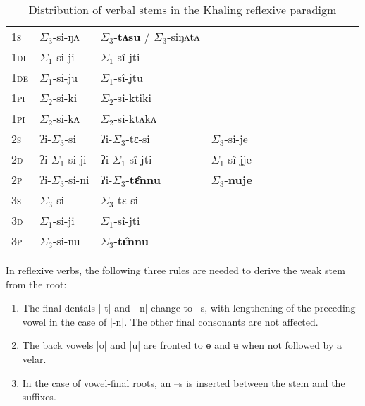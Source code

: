 \documentclass[twoside,a4paper,11pt]{article}
\newcommand{\ipa}[1]{{\phon#1}}
\newcommand{\grise}[1]{\cellcolor{lightgray}\textbf{#1}}
\newcommand{\grisf}[1]{\cellcolor{gray}\textbf{#1}}
\newcommand{\ra}{$\Sigma_1$}
\newcommand{\rbb}{$\Sigma_2$}
\newcommand{\rc}{$\Sigma_3$}
\begin{document}
\begin{table}[h]
\caption{ Distribution of verbal stems in the Khaling reflexive paradigm}
\label{tab:reflstems} \centering 
\begin{tabular}{l|l|l|l|l|l|l|l|l|l|l|l|l}  \toprule
\textsc{1s}  &  \ipa{\rc{}-si-ŋʌ}   &  \ipa{\rc{}-\textbf{tʌsu}} / \ipa{\rc{}-siŋʌtʌ}   \\ 
\textsc{1di}  &  \ipa{\ra{}-si-ji}  \grise{} &  \ipa{\ra{}-sî-jti} \grise{} \\
\textsc{1de}  &  \ipa{\ra{}-si-ju} \grise{}   &  \ipa{\ra{}-sî-jtu} \grise{} \\ 
\textsc{1pi}  &  \ipa{\rbb{}-si-ki} \grisf{}  &  \ipa{\rbb{}-si-ktiki} \grisf{}  \\ 
\textsc{1pi}  &  \ipa{\rbb{}-si-kʌ}  \grisf{}   &  \ipa{\rbb{}-si-ktʌkʌ} \grisf{} \\ 
\midrule
\textsc{2s}  &  \ipa{ʔi-\rc{}-si}   &  \ipa{ʔi-\rc{}-tɛ-si}   &  \ipa{\rc{}-si-je} \\ 
\textsc{2d}  &  \ipa{ʔi-\ra{}-si-ji}  \grise{}  &  \ipa{ʔi-\ra{}-sî-jti} \grise{}   &  \ipa{\ra{}-sî-jje} \grise{} \\
\textsc{2p}  &  \ipa{ʔi-\rc{}-si-ni}   &  \ipa{ʔi-\rc{}-\textbf{tɛ̂nnu}}   &  \ipa{\rc{}-\textbf{nuje}}  \\ 
\midrule
\textsc{3s}  &  \ipa{\rc{}-si}   &  \ipa{\rc{}-tɛ-si} \\ 
\textsc{3d}  &  \ipa{\ra{}-si-ji} \grise{}   &  \ipa{\ra{}-sî-jti}\grise{} \\ 
\textsc{3p}  &  \ipa{\rc{}-si-nu}   &  \ipa{\rc{}-\textbf{tɛ̂nnu}}  \\ 
\bottomrule
\end{tabular}
\end{table}

In reflexive verbs, the following three rules are needed to derive the weak stem from the root:

\begin{enumerate}
\item The final dentals |\ipa{-t}| and |\ipa{-n}| change to --\ipa{s}, with lengthening of the preceding  vowel in the case of |\ipa{-n}|. The other final consonants are not affected.
\item The back vowels |\ipa{o}| and |\ipa{u}| are fronted to \ipa{ɵ} and \ipa{ʉ} when not followed by a velar.
\item In the case of vowel-final roots, an --\ipa{s} is inserted between the stem and the suffixes.
\end{enumerate}
 
\end{document}
